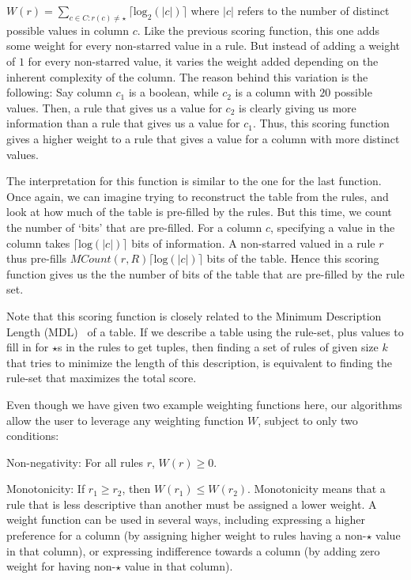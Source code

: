 $W(r) = \sum_{c \in C : r(c) \neq \star} \lceil \text{log}_2(|c|) \rceil$ where $|c|$ refers to the number of distinct possible values in column $c$. Like the previous scoring function, this one adds some weight for every non-starred value in a rule. But instead of adding a weight of $1$ for every non-starred value, it varies the weight added depending on the inherent complexity of the column. The reason behind this variation is the following: Say column $c_1$ is a boolean, while $c_2$ is a column with $20$ possible values. Then, a rule that gives us a value for $c_2$ is clearly giving us more information than a rule that gives us a value for $c_1$. Thus, this scoring function gives a higher weight to a rule that gives a value for a column with more distinct values. 

The interpretation for this function is similar to the one for the last function. Once again, we can imagine trying to reconstruct the table from the rules, and look at how much of the table is pre-filled by the rules. But this time, we count the number of `bits' that are pre-filled. For a column $c$, specifying a value in the column takes $\lceil \text{log}(|c|)\rceil$ bits of information. A non-starred valued in a rule $r$ thus pre-fills $MCount(r,R) \lceil \text{log}(|c|) \rceil$ bits of the table. Hence this scoring function gives us the the number of bits of the table that are pre-filled by the rule set.

Note that this scoring function is closely related to the Minimum Description Length (MDL)~\cite{Grunwald:2007:MDL:1213810} of a table. If we describe a table using the rule-set, plus values to fill in for $\star$s in the rules to get tuples, then finding a set of rules of given size $k$ that tries to minimize the length of this description, is equivalent to finding the rule-set that maximizes the total score. 

\smallskip

Even though we have given two example weighting functions here, our algorithms allow the user to leverage any weighting function $W$, subject to only two conditions:
\squishlist
\item Non-negativity: For all rules $r$, $W(r) \geq 0$.
\item Monotonicity: If $r_1 \geq r_2$, then $W(r_1) \leq W(r_2)$. Monotonicity means that a rule that is less descriptive than another must be assigned a lower weight.
\squishend
A weight function can be used in several ways, including expressing a higher preference for a column (by assigning higher weight to rules having a non-$\star$ value in that column), or expressing indifference towards a column (by adding zero weight for having non-$\star$ value in that column).

